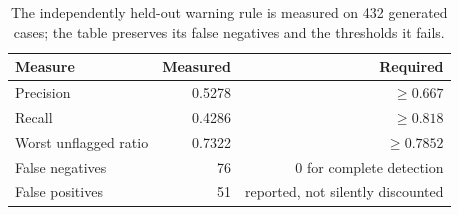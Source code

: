 \begin{table}[htbp]\centering
\caption{The independently held-out warning rule is measured on 432 generated cases; the table preserves its false negatives and the thresholds it fails.}\label{tab:guard-validation}
\begin{tabular}{lrr}\toprule Measure & Measured & Required \\ \midrule
Precision & 0.5278 & $\geq 0.667$ \\
Recall & 0.4286 & $\geq 0.818$ \\
Worst unflagged ratio & 0.7322 & $\geq 0.7852$ \\
False negatives & 76 & 0 for complete detection \\
False positives & 51 & reported, not silently discounted \\
\bottomrule\end{tabular}\end{table}
